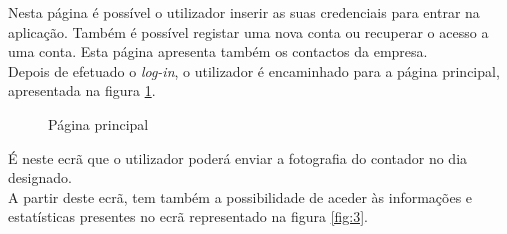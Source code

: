 Nesta página é possível o utilizador inserir as suas credenciais para entrar na aplicação. Também é possível registar uma nova conta ou recuperar o acesso a uma conta. Esta página apresenta também os contactos da empresa.\\
Depois de efetuado o \textit{log-in}, o utilizador é encaminhado para a página principal, apresentada na figura \ref{fig:2}.

\begin{figure}[ht!]
\centering
{}
\caption{Página principal}
\label{fig:2}
\end{figure}

É neste ecrã que o utilizador poderá enviar a fotografia do contador no dia designado. \\
A partir deste ecrã, tem também a possibilidade de aceder às informações e estatísticas presentes no ecrã representado na figura \ref{fig:3}. 

